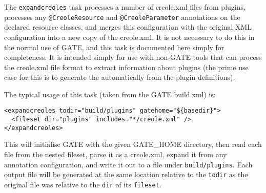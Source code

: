 
The \texttt{expandcreoles} task processes a number of creole.xml files from
plugins, processes any \verb|@CreoleResource| and \verb|@CreoleParameter|
annotations on the declared resource classes, and merges this configuration
with the original XML configuration into a new copy of the creole.xml.  It is
not necessary to do this in the normal use of GATE, and this task is documented
here simply for completeness.  It is intended simply for use with non-GATE
tools that can process the creole.xml file format to extract information about
plugins (the prime use case for this is to generate the
automatically from the plugin definitions).

The typical usage of this task (taken from the GATE build.xml) is:

\begin{small}
\begin{verbatim}
<expandcreoles todir="build/plugins" gatehome="${basedir}">
  <fileset dir="plugins" includes="*/creole.xml" />
</expandcreoles>
\end{verbatim}
\end{small}

This will initialise GATE with the given GATE\_HOME directory, then read each
file from the nested fileset, parse it as a creole.xml, expand it from any
annotation configuration, and write it out to a file under
\texttt{build/plugins}.  Each output file will be generated at the same
location relative to the \texttt{todir} as the original file was relative to
the \texttt{dir} of its \texttt{fileset}.

